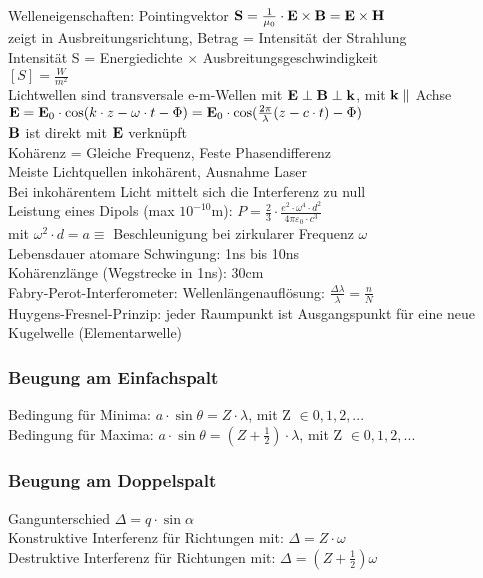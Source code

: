 \documentclass[fs, footer]{latex4ei}
\begin{document}
\begin{multicols*}{4}
Welleneigenschaften: 
Pointingvektor $\textbf{S}=\frac{1}{\mu_0}\cdot \textbf{E} \times \textbf{B} = \textbf{E} \times \textbf{H}$ \\
zeigt in Ausbreitungsrichtung, Betrag = Intensität der Strahlung\\
Intensität S = Energiedichte $\times$ Ausbreitungsgeschwindigkeit\\
$[S]  = \frac{W}{m^2}$\\
Lichtwellen sind transversale e-m-Wellen mit $\textbf{E}\perp \textbf{B} \perp\textbf{k}$, mit $\textbf{k} \parallel$ Achse\\
$\textbf{E} = \textbf{E}_0\cdot\cos(k\cdot z - \omega\cdot t - \Phi) = \textbf{E}_0\cdot \cos(\frac{2\pi}{\lambda}(z-c\cdot t)-\Phi)$\\
$\textbf{B}$ ist direkt mit $\textbf{E}$ verknüpft\\
Kohärenz = Gleiche Frequenz, Feste Phasendifferenz\\
Meiste Lichtquellen inkohärent, Ausnahme Laser\\
Bei inkohärentem Licht mittelt sich die Interferenz zu null\\

Leistung eines Dipols (max $10^{-10}$m): $P = \frac{2}{3}\cdot\frac{e^2\cdot\omega^4\cdot d^2}{4\pi\varepsilon_0\cdot c^3}$\\
mit $\omega^2\cdot d = a \equiv$ Beschleunigung bei zirkularer Frequenz $\omega$\\ 
Lebensdauer atomare Schwingung: 1ns bis 10ns\\
Kohärenzlänge (Wegstrecke in 1ns): 30cm\\
Fabry-Perot-Interferometer: Wellenlängenauflösung: $\frac{\Delta \lambda}{\lambda} = \frac{n}{N}$\\
Huygens-Fresnel-Prinzip: jeder Raumpunkt ist Ausgangspunkt für eine neue Kugelwelle (Elementarwelle)\\

\subsubsection{Beugung am Einfachspalt}
Bedingung für Minima: $a\cdot\sin\theta = Z\cdot\lambda$, mit Z $\in 0,1,2,...$\\ %
Bedingung für Maxima: $a\cdot\sin\theta = (Z+\frac{1}{2})\cdot\lambda$, mit Z $\in 0,1,2,...$\\%
\subsubsection{Beugung am Doppelspalt}
Gangunterschied $\Delta = q\cdot\sin\alpha$\\
Konstruktive Interferenz für Richtungen mit: $\Delta = Z \cdot \omega$\\
Destruktive Interferenz für Richtungen mit: $\Delta = (Z+\frac{1}{2})\omega$\\

\end{multicols*}
\end{document}
